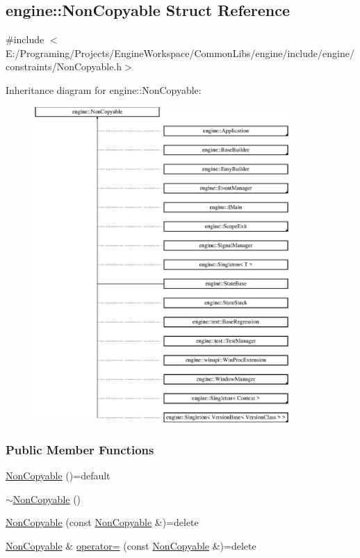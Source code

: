 \hypertarget{a00058}{}\subsection{engine\+:\+:Non\+Copyable Struct Reference}
\label{a00058}


{\ttfamily \#include $<$E\+:/\+Programing/\+Projects/\+Engine\+Workspace/\+Common\+Libs/engine/include/engine/constraints/\+Non\+Copyable.\+h$>$}

Inheritance diagram for engine\+:\+:Non\+Copyable\+:\begin{figure}[H]
\begin{center}
\leavevmode
\includegraphics[height=12.000000cm]{a00058}
\end{center}
\end{figure}
\subsubsection*{Public Member Functions}
\begin{DoxyCompactItemize}
\item 
\hyperlink{a00058_a9f7cb34234d5117fbe31e0e82cf164b8}{Non\+Copyable} ()=default
\item 
\hyperlink{a00058_a30addd3c42fbbe053a7484ed209ef8c3}{$\sim$\+Non\+Copyable} ()
\item 
\hyperlink{a00058_a6018f0c6b722b97077bfb807f03f0f69}{Non\+Copyable} (const \hyperlink{a00058}{Non\+Copyable} \&)=delete
\item 
\hyperlink{a00058}{Non\+Copyable} \& \hyperlink{a00058_a21f1cc26f8f967d5c636e580cc728821}{operator=} (const \hyperlink{a00058}{Non\+Copyable} \&)=delete
\end{DoxyCompactItemize}


